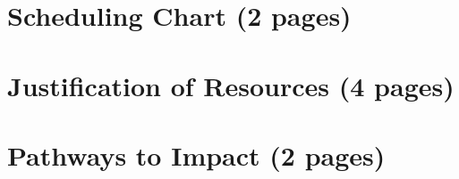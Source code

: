 \documentclass[12pts,a4paper,amsmath,amssymb,floatfix]{article}%
\begin{document}
\begin{comment}
term storage capacity and distribution of the considered subsurface storage sites. The output and 3D simulation will also be used to communicate to other interested stake holders, eg. Scottish Government, DTI, Local Government, EC, other power generators, environmental agencies, and not least the general public, the process and potential of subsurface CO2 storage.

\end{comment}



\section{Scheduling Chart (2 pages)}



\section{Justification of Resources (4 pages)}


\section{Pathways to Impact (2 pages)}
\end{document}
